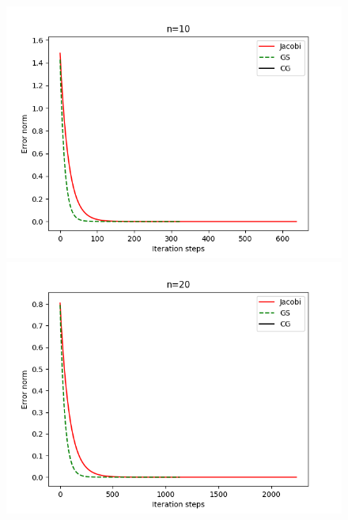 \documentclass{ctexart}
\begin{document}
\begin{figure}
    \centering
    \begin{minipage}{8.5cm}
         \includegraphics[scale= 0.5]{Figure_10}
    \end{minipage}
    \begin{minipage}{8.5cm}
         \includegraphics[scale= 0.5]{Figure_20}
    \end{minipage}
    

\end{figure}
\end{document}
